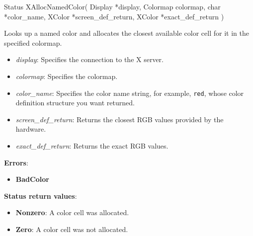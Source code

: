 \documentclass{report}
\begin{document}
\begin{itemize}
            \begin{cppcode}
                Status XAllocNamedColor(
                    Display *display,
                    Colormap colormap,
                    char *color_name,
                    XColor *screen_def_return,
                    XColor *exact_def_return
                )
            \end{cppcode}
            \bigbreak \noindent
            Looks up a named color and allocates the closest available color cell for it in the specified colormap.
            \begin{itemize}
                \item \textit{display}: Specifies the connection to the X server.
                \item \textit{colormap}: Specifies the colormap.
                \item \textit{color\_name}: Specifies the color name string, for example, \texttt{red}, whose color definition structure you want returned.
                \item \textit{screen\_def\_return}: Returns the closest RGB values provided by the hardware.
                \item \textit{exact\_def\_return}: Returns the exact RGB values.
            \end{itemize}
            \bigbreak \noindent
            \textbf{Errors}:
            \begin{itemize}
                \item \textbf{BadColor}
            \end{itemize}
            \bigbreak \noindent
            \textbf{Status return values}:
            \begin{itemize}
                \item \textbf{Nonzero}: A color cell was allocated.
                \item \textbf{Zero}: A color cell was not allocated.
            \end{itemize}


\end{itemize}
\end{document}
